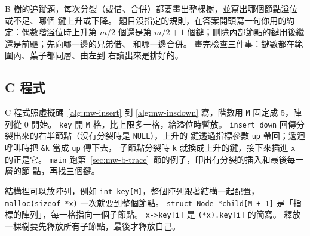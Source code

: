 \begin{examnote}
B 樹的追蹤題，每次分裂（或借、合併）都要畫出整棵樹，並寫出哪個節點溢位或不足、哪個
鍵上升或下降。 題目沒指定的規則，在答案開頭寫一句你用的約定：偶數階溢位時上升第
$m/2$ 個還是第 $m/2 + 1$ 個鍵；刪除內部節點的鍵用後繼還是前驅；先向哪一邊的兄弟借、
和哪一邊合併。 畫完檢查三件事：鍵數都在範圍內、葉子都同層、由左到
右讀出來是排好的。
\end{examnote}

\subsection{C 程式}
\label{sec:mw-c}

C 程式照虛擬碼~\ref{alg:mw-insert} 到 \ref{alg:mw-insdown} 寫，階數用 \texttt{M} 固定成
$5$，陣列從 $0$ 開始。 \texttt{key} 開 \texttt{M} 格，比上限多一格，給溢位時暫放。
\texttt{insert\_down} 回傳分裂出來的右半節點（沒有分裂時是 \texttt{NULL}），上升的
鍵透過指標參數 \texttt{up} 帶回；遞迴呼叫時把 \texttt{\&k} 當成 \texttt{up} 傳下去，
子節點分裂時 \texttt{k} 就換成上升的鍵，接下來插進 \texttt{x} 的正是它。
\texttt{main} 跑第~\ref{sec:mw-b-trace}~節的例子，印出有分裂的插入和最後每一層的節
點，再找三個鍵。

\begin{cbookrecap}[第~14~章 14.2、14.5 節，第~19~章 19.3 節]
結構裡可以放陣列，例如 \texttt{int key[M]}，整個陣列跟著結構一起配置，
\texttt{malloc(sizeof *x)} 一次就要到整個節點。 \texttt{struct Node *child[M + 1]}
是「指標的陣列」，每一格指向一個子節點。 \texttt{x->key[i]} 是 \texttt{(*x).key[i]}
的簡寫。 釋放一棵樹要先釋放所有子節點，最後才釋放自己。
\end{cbookrecap}

